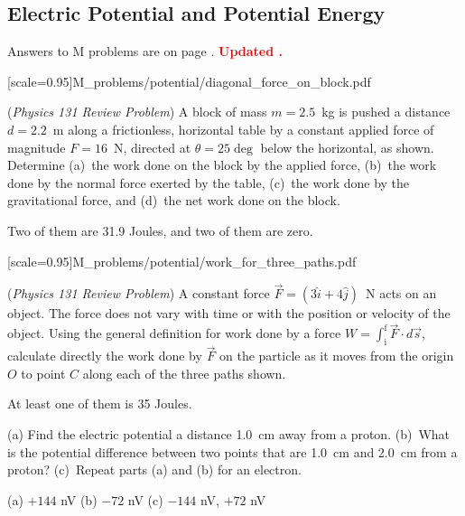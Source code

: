\subsection{Electric Potential and Potential Energy} 


Answers to M problems are on page \pageref{potential_prob_answers}.  \textbf{\textcolor{red}{Updated \DTMnow.}}

[scale=0.95]{M_problems/potential/diagonal_force_on_block.pdf}{
\begin{Exercise}
(\textit{Physics 131 Review Problem}) 
A block of mass $m=2.5$~kg is pushed a distance $d=2.2$~m along
a frictionless, horizontal table by a constant applied force of magnitude $F=16$~N, 
directed at $\theta=25 \deg$ below the horizontal, as shown.  
Determine (a)~the work done on the block by the applied force, (b)~the work done by the normal force exerted by the table, 
(c)~the work done by the gravitational force, and (d)~the net work done on the block.  
\end{Exercise}
\begin{Answer}
Two of them are 31.9 Joules, and two of them are zero.
\end{Answer}
}

[scale=0.95]{M_problems/potential/work_for_three_paths.pdf}{
\begin{Exercise}
(\textit{Physics 131 Review Problem}) A constant force $\vec{F} = (3\hat{i}+4\hat{j})$~N acts on an object. 
The force does not vary with time or with the position or velocity of the object.  
Using the general definition for work done by a force \(\displaystyle W = \int_\text{i}^\text{f} \vec{F} \cdot d\vec{s}\), 
calculate directly the work done by $\vec{F}$ on the particle as it moves from the origin $O$ to point $C$ along each of the three paths shown.  
\end{Exercise}
\begin{Answer}
At least one of them is 35 Joules.
\end{Answer}


\begin{Exercise}
(a) Find the electric potential a distance 1.0~cm away from a proton.  
(b)~What is the potential difference between two points that are 1.0~cm and 2.0~cm from a proton?  
(c)~Repeat parts (a) and (b) for an electron.  
\end{Exercise}
\begin{Answer}
(a) $+144$ nV (b) $-72$ nV (c) $-144$ nV, $+72$ nV
\end{Answer}
}


